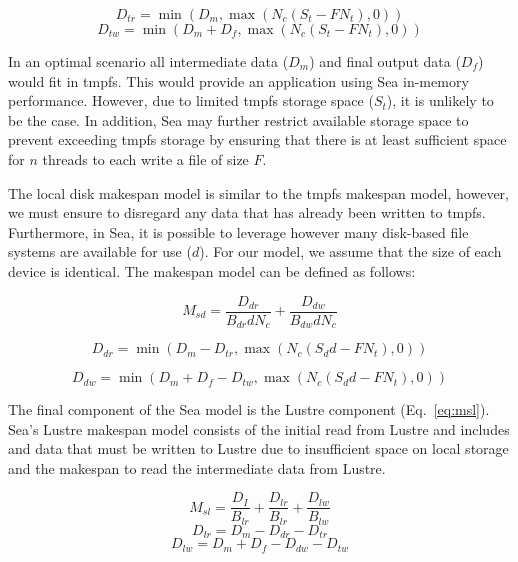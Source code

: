 \documentclass{report}
\begin{document}
    \begin{equation}\label{eq:dtr}
        D_{tr} = \min\left(D_{m}, \max{\left(N_{c}(S_{t} - FN_{t}), 0 \right)} \right)
    \end{equation}
    \begin{equation}\label{eq:dtw}
        D_{tw} = \min\left(D_{m} + D_{f}, \max{\left(N_{c}(S_{t} - FN_{t}), 0 \right)} \right)
    \end{equation}

    In an optimal scenario all intermediate data ($D_{m}$) and final output
    data ($D_{f}$) would fit in tmpfs. This would provide an application using
    Sea in-memory performance. However, due to limited tmpfs storage space ($S_{t}$), it is unlikely to be the case. In addition, Sea may further restrict
    available storage space to prevent exceeding tmpfs storage by ensuring that
    there is at least sufficient space for $n$ threads to each write a file of 
    size $F$.

    The local disk  makespan model is similar to the tmpfs makespan model, however, we
    must ensure to disregard any data that has already been written to tmpfs.
    Furthermore, in Sea, it is possible to leverage however many disk-based
    file systems are available for use ($d$). For our model, we assume that the
    size of each device is identical. 
    The makespan model can be defined as follows:

    \begin{equation}\label{eq:msd}
        M_{sd} =  \frac{D_{dr}}{B_{dr}dN_{c}} + \frac{D_{dw}}{B_{dw}dN_{c}}
    \end{equation}

    \begin{equation}\label{eq:ddr}
        D_{dr} = \min{(D_{m} - D_{tr}, \max{(N_{c}(S_{d}d - FN_{t}),0)})}
    \end{equation}

    \begin{equation}\label{eq:ddw}
        D_{dw} = \min{(D_{m} + D_{f} - D_{tw}, \max{(N_{c}(S_{d}d - FN_{t}),0)})}
    \end{equation}


    The final component of the Sea model is the Lustre component (Eq.~\ref{eq:msl}). Sea's Lustre
    makespan model consists of the initial read from Lustre and includes and
    data that must be written to Lustre due to insufficient space on local
    storage and the makespan to read the intermediate data from Lustre.

    \begin{equation}\label{eq:msl}
        M_{sl} = \frac{D_{I}}{B_{lr}} + \frac{D_{lr}}{B_{lr}} + \frac{D_{lw}}{B_{lw}}
    \end{equation}
    \begin{equation}\label{eq:dlr}
        D_{lr} = D_{m} - D_{dr} - D_{tr}
    \end{equation}
    \begin{equation}\label{eq:dlw}
        D_{lw} = D_{m} + D_{f} - D_{dw} - D_{tw}
    \end{equation}
\end{document}
